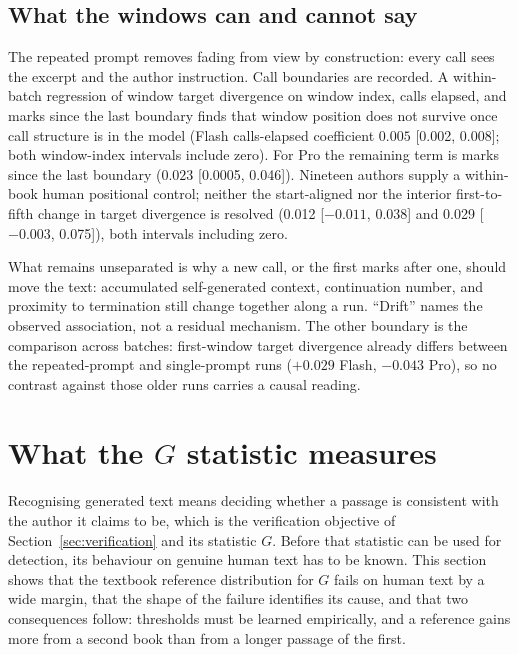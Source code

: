 \documentclass[11pt]{article}
\begin{document}
\subsection{What the windows can and cannot say}

The repeated prompt removes fading from view by construction: every call
sees the excerpt and the author instruction.  Call boundaries are
recorded.  A within-batch regression of window target divergence on
window index, calls elapsed, and marks since the last boundary finds that
window position does not survive once call structure is in the model
(Flash calls-elapsed coefficient \(0.005\) [0.002, 0.008]; both
window-index intervals include zero).  For Pro the remaining term is
marks since the last boundary (\(0.023\) [0.0005, 0.046]).  Nineteen
authors supply a within-book human positional control; neither the
start-aligned nor the interior first-to-fifth change in target
divergence is resolved (0.012 [\(-0.011\), 0.038] and 0.029
[\(-0.003\), 0.075]), both intervals including zero.

What remains unseparated is why a new call, or the first marks after one,
should move the text: accumulated self-generated context, continuation
number, and proximity to termination still change together along a run.
``Drift'' names the observed association, not a residual mechanism.  The
other boundary is the comparison across batches: first-window target
divergence already differs between the repeated-prompt and single-prompt runs
(\(+0.029\) Flash, \(-0.043\) Pro), so no contrast against those older
runs carries a causal reading.

\FloatBarrier
\section{What the \texorpdfstring{\(G\)}{G} statistic measures}
\label{sec:g-statistic}

Recognising generated text means deciding whether a passage is consistent
with the author it claims to be, which is the verification objective of
Section~\ref{sec:verification} and its statistic \(G\).  Before that
statistic can be used for detection, its behaviour on genuine human text
has to be known.  This section shows that the textbook reference
distribution for \(G\) fails on human text by a wide margin, that the
shape of the failure identifies its cause, and that two consequences
follow: thresholds must be learned empirically, and a reference gains more
from a second book than from a longer passage of the first.
\end{document}
